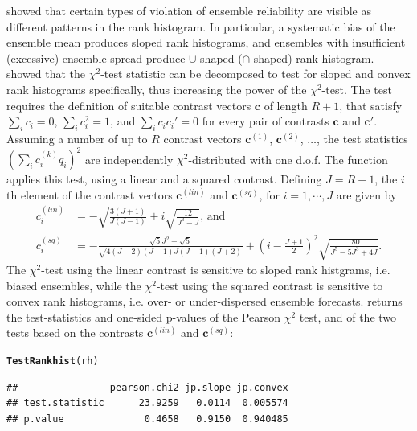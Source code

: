 \documentclass[article]{jss}\usepackage{graphicx, color}
\makeatletter
\newcommand{\hlfunctioncall}[1]{\textcolor[rgb]{0,0.501960784313725,0.752941176470588}{\textbf{#1}}}%
\newenvironment{kframe}{%
 \def\at@end@of@kframe{}%
 \ifinner\ifhmode%
  \def\at@end@of@kframe{\end{minipage}}%
  \begin{minipage}{\columnwidth}%
 \fi\fi%
 \def\FrameCommand##1{\hskip\@totalleftmargin \hskip-\fboxsep
 \colorbox{shadecolor}{##1}\hskip-\fboxsep
     \hskip-\linewidth \hskip-\@totalleftmargin \hskip\columnwidth}%
 \MakeFramed {\advance\hsize-\width
   \@totalleftmargin\z@ \linewidth\hsize
   \@setminipage}}%
 {\par\unskip\endMakeFramed%
 \at@end@of@kframe}
\newenvironment{knitrout}{}{} %
\makeatother
\begin{document}
\citet{hamill2001interpretation} showed that certain types of violation of ensemble reliability are visible as different patterns in the rank histogram.
In particular, a systematic bias of the ensemble mean produces sloped rank histograms, and ensembles with insufficient (excessive) ensemble spread produce $\cup$-shaped ($\cap$-shaped) rank histogram.
\citet{jolliffe2008evaluating} showed that the $\chi^2$-test statistic can be decomposed to test for sloped and convex rank histograms specifically, thus increasing the power of the $\chi^2$-test.
The test requires the definition of suitable contrast vectors $\mathbf{c}$ of length $R+1$, that satisfy $\sum_i c_i = 0$, $\sum_i c_i^2 = 1$, and $\sum_i c_i c_i' = 0$ for every pair of contrasts $\mathbf{c}$ and $\mathbf{c}'$.
Assuming a number of up to $R$ contrast vectors $\mathbf{c}^{(1)}$, $\mathbf{c}^{(2)}$, $\dots$, the test statistics $(\sum_i c^{(k)}_i q_i)^2$ are independently $\chi^2$-distributed with one d.o.f. 
The function  applies this test, using a linear and a squared contrast. 
Defining $J=R+1$, the $i$th element of the contrast vectors $\mathbf{c}^{(lin)}$ and $\mathbf{c}^{(sq)}$, for $i=1,\cdots,J$ are given by
%
\begin{align}
c^{(lin)}_i & = -\sqrt{\frac{3(J+1)}{J (J-1)}} + i \sqrt{\frac{12}{J^3 - J}}\text{, and}\\
c^{(sq)}_i & =  - \frac{\sqrt{5}  J^2 - \sqrt{5}}{\sqrt{4(J - 2)  (J-1) J (J+1) (J+2)}}+ \left(i - \frac{J+1}{2}\right)^2   \sqrt{\frac{180}{ J^5 - 5 J^3 + 4 J}}.
\end{align}
%
The $\chi^2$-test using the linear contrast is sensitive to sloped rank histgrams, i.e. biased ensembles, while the $\chi^2$-test using the squared contrast is sensitive to convex rank histograms, i.e. over- or under-dispersed ensemble forecasts.
 returns the test-statistics and one-sided p-values of the Pearson $\chi^2$ test, and of the two tests based on the contrasts $\mathbf{c}^{(lin)}$ and $\mathbf{c}^{(sq)}$:

\begin{knitrout}
\color{fgcolor}\begin{kframe}
\begin{alltt}
\hlfunctioncall{TestRankhist}(rh)
\end{alltt}
\begin{verbatim}
##                pearson.chi2 jp.slope jp.convex
## test.statistic      23.9259   0.0114  0.005574
## p.value              0.4658   0.9150  0.940485
\end{verbatim}
\end{kframe}
\end{knitrout}
\end{document}
